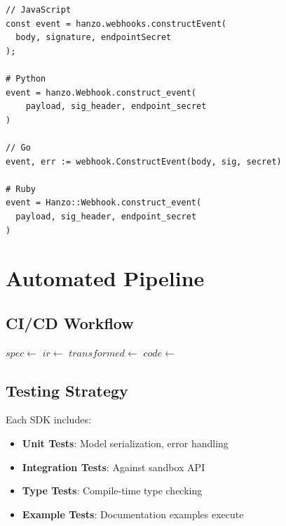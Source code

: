 \documentclass[11pt,a4paper]{article}
\begin{document}
\begin{lstlisting}[caption=Webhook Verification]
// JavaScript
const event = hanzo.webhooks.constructEvent(
  body, signature, endpointSecret
);

# Python
event = hanzo.Webhook.construct_event(
    payload, sig_header, endpoint_secret
)

// Go
event, err := webhook.ConstructEvent(body, sig, secret)

# Ruby
event = Hanzo::Webhook.construct_event(
  payload, sig_header, endpoint_secret
)
\end{lstlisting}

\section{Automated Pipeline}

\subsection{CI/CD Workflow}

\begin{algorithm}
\caption{SDK Release Pipeline}
\begin{algorithmic}[1]
    \State $spec \gets$ 
    \State $ir \gets$ 
        \State $transformed \gets$ 
        \State $code \gets$ 
        \State {}
        \State {}
        \State {}
        \State {}
    \EndFor
\EndFunction
\end{algorithmic}
\end{algorithm}

\subsection{Testing Strategy}

Each SDK includes:

\begin{itemize}
    \item \textbf{Unit Tests}: Model serialization, error handling
    \item \textbf{Integration Tests}: Against sandbox API
    \item \textbf{Type Tests}: Compile-time type checking
    \item \textbf{Example Tests}: Documentation examples execute
\end{itemize}
\end{document}
